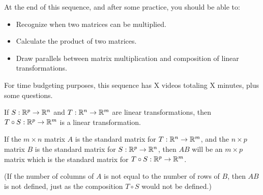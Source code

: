 







At the end of this sequence, and after some practice, you should be able to:

\begin{itemize}
\item Recognize when two matrices can be multiplied.  
\item Calculate the product of two matrices. 
\item Draw parallels between matrix multiplication and composition of linear transformations.
\end{itemize}


For time budgeting purposes, this sequence has X videos totaling X minutes, 
plus some questions.  




\endedxtext

\endedxvertical







{}  
If $S: \mathbb R^p \rightarrow \mathbb R^n$ and $T: \mathbb R^n \rightarrow \mathbb R^m$ are linear transformations, then $T\circ S: \mathbb R^p \rightarrow \mathbb R^m$ is a linear transformation.  

{}  
If the $m\times n$ matrix $A$ is the standard matrix for $T: \mathbb R^n \rightarrow \mathbb R^m$, and the $n\times p$ matrix $B$ is the standard matrix for $S: \mathbb R^p \rightarrow \mathbb R^n$, then $AB$ will be an $m\times p$ matrix which is the standard matrix for
$T\circ S: \mathbb R^p \rightarrow \mathbb R^m$.  

(If the number of columns of $A$ is not equal to the number of rows of $B$, then $AB$ is not defined, just as the composition $T\circ S$ would not  be defined.)  

\endedxtext




\endedxvertical










